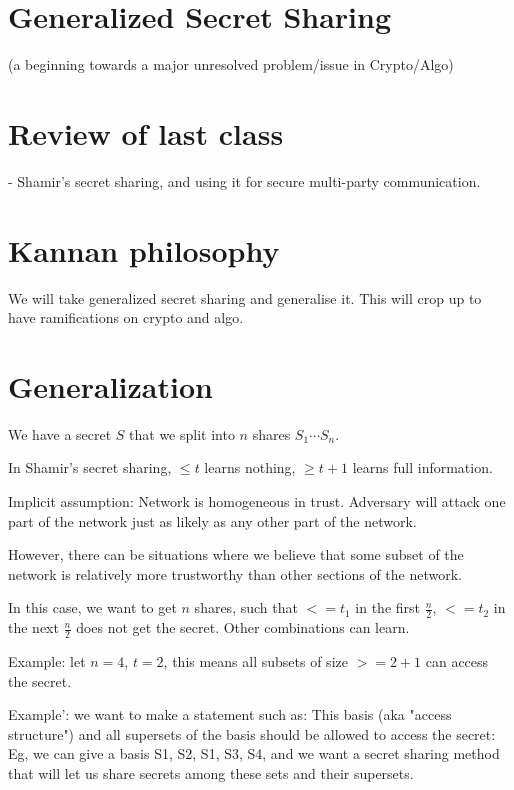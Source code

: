 \section{Generalized Secret Sharing}

(a beginning towards a major unresolved
problem/issue in Crypto/Algo)

\section{Review of last class}
- Shamir's secret sharing, and using it for secure
multi-party communication.


\section{Kannan philosophy}

We will take generalized secret sharing and generalise it. This will crop
up to have ramifications on crypto and algo.

\section{Generalization}

We have a secret $S$ that we split into $n$ shares $S_1\cdots S_n$.

In Shamir's secret sharing, $\leq t$ learns nothing, $\geq t + 1$ learns
full information.

Implicit assumption: Network is homogeneous in trust. Adversary will attack
one part of the network just as likely as any other part of the network.


However, there can be situations where we believe that some subset of the
network is relatively more trustworthy than other sections of the network.

In this case, we want to get $n$ shares, such that $<= t_1$ in the first
$\frac{n}{2}$, $<= t_2$ in the next $\frac{n}{2}$ does not get the secret.
Other combinations can learn.

Example: let $n = 4$, $t = 2$, this means all subsets of size $>= 2 + 1$
can access the secret.

Example': we want to make a statement such as: This basis (aka "access structure")
and all supersets of the basis should be allowed to access the secret:
Eg, we can give a basis 
{{S1, S2}, {S1, S3, S4}}, and we want a secret sharing method that will let
us share secrets among these sets and their supersets.



